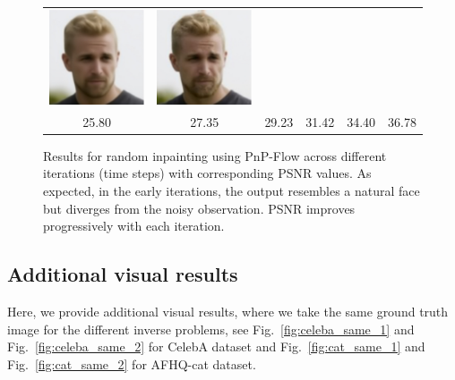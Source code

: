 \documentclass{article} %
\theoremstyle{definition}
\begin{document}
\begin{figure}[htb]
\begin{adjustbox}{max width=1.0\textwidth}
\begin{tabular}{c@{}c@{}c@{}c@{}c@{}c@{}}
            \includegraphics[width=.19\textwidth]{figures/celeba/progression/random_inpainting_pnp_flow_batch11_im1_iter90_pnsr34.40.pdf} &

            \includegraphics[width=.19\textwidth]{figures/celeba/progression/random_inpainting_pnp_flow_batch11_im1_iterfinal_pnsr36.78.pdf} \\
        
  
   \textcolor{red!50!green}{25.80}
  & \textcolor{red!40!green}{27.35}
  & \textcolor{red!30!green}{29.23}
  & \textcolor{red!20!green}{31.42}
  & \textcolor{red!10!green}{34.40}
  & \textcolor{red!0!green}{36.78}
  \end{tabular}
    \end{adjustbox}
    \caption{Results for random inpainting using PnP-Flow across different iterations (time steps) with corresponding PSNR values. As expected, in the early iterations, the output resembles a natural face but diverges from the noisy observation. PSNR improves progressively with each iteration.}
    \label{fig:progression}
\end{figure}






\subsection{Additional visual results}
\label{sec:app_more_visuals}
Here, we provide additional visual results, where we take the same ground truth image for the different inverse problems, see Fig.~\ref{fig:celeba_same_1} and Fig.~\ref{fig:celeba_same_2} for CelebA dataset and Fig.~\ref{fig:cat_same_1} and Fig.~\ref{fig:cat_same_2} for AFHQ-cat dataset. 
\end{document}
